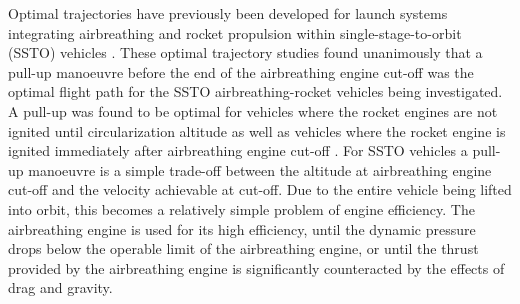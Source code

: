 Optimal trajectories have previously been developed for launch systems integrating airbreathing and rocket propulsion within single-stage-to-orbit (SSTO) vehicles \cite{Powell1991,Lu1993,Trefny1999}. These optimal trajectory studies found unanimously that a pull-up manoeuvre before the end of the airbreathing engine cut-off was the optimal flight path for the SSTO airbreathing-rocket vehicles being investigated. A pull-up was found to be optimal for vehicles where the rocket engines are not ignited until circularization altitude \cite{Powell1991,Lu1993} as well as vehicles where the rocket engine is ignited immediately after airbreathing engine cut-off \cite{Trefny1999}. For SSTO vehicles a pull-up manoeuvre is a simple trade-off between the altitude at airbreathing engine cut-off and the velocity achievable at cut-off. Due to the entire vehicle being lifted into orbit, this becomes a relatively simple problem of engine efficiency. The airbreathing engine is used for its high efficiency, until the dynamic pressure drops below the operable limit of the airbreathing engine, or until the thrust provided by the airbreathing engine is significantly counteracted by the effects of drag and gravity. 
